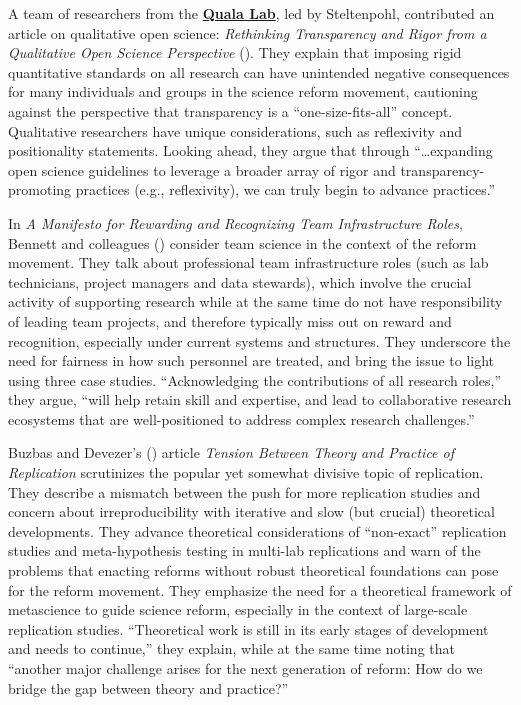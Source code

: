 \documentclass[authordate, editorial, noabstract, issue]{jote-new-article}
\begin{document}
A team of researchers from the \textbf{\href{https://qualalab.org/}{Quala Lab}}, led by Steltenpohl, contributed an article on qualitative open science: \emph{Rethinking Transparency and Rigor from a Qualitative Open Science Perspective} (\hspace*{-2pt}\citeyear{Steltenpohl2023}). They explain that imposing rigid quantitative standards on all research can have unintended negative consequences for many individuals and groups in the science reform movement, cautioning against the perspective that transparency is a “one-size-fits-all” concept. Qualitative researchers have unique considerations, such as reflexivity and positionality statements. Looking ahead, they argue that through “…expanding open science guidelines to leverage a broader array of rigor and transparency-promoting practices (e.g., reflexivity), we can truly begin to advance practices.”



In \emph{A Manifesto for Rewarding and Recognizing Team Infrastructure Roles}, Bennett and colleagues (\hspace*{-2pt}\citeyear{Bennett2023}) consider team science in the context of the reform movement. They talk about professional team infrastructure roles (such as lab technicians, project managers and data stewards), which involve the crucial activity of supporting research while at the same time do not have responsibility of leading team projects, and therefore typically miss out on reward and recognition, especially under current systems and structures. They underscore the need for fairness in how such personnel are treated, and bring the issue to light using three case studies. “Acknowledging the contributions of all research roles,” they argue, “will help retain skill and expertise, and lead to collaborative research ecosystems that are well-positioned to address complex research challenges.”



Buzbas and Devezer's (\hspace*{-2pt}\citeyear{Buzbas2023}) article \emph{Tension Between Theory and Practice of Replication} scrutinizes the popular yet somewhat divisive topic of replication. They describe a mismatch between the push for more replication studies and concern about irreproducibility with iterative and slow (but crucial) theoretical developments. They advance theoretical considerations of “non-exact” replication studies and meta-hypothesis testing in multi-lab replications and warn of the problems that enacting reforms without robust theoretical foundations can pose for the reform movement. They emphasize the need for a theoretical framework of metascience to guide science reform, especially in the context of large-scale replication studies. “Theoretical work is still in its early stages of development and needs to continue,” they explain, while at the same time noting that “another major challenge arises for the next generation of reform: How do we bridge the gap between theory and practice?”
\end{document}
